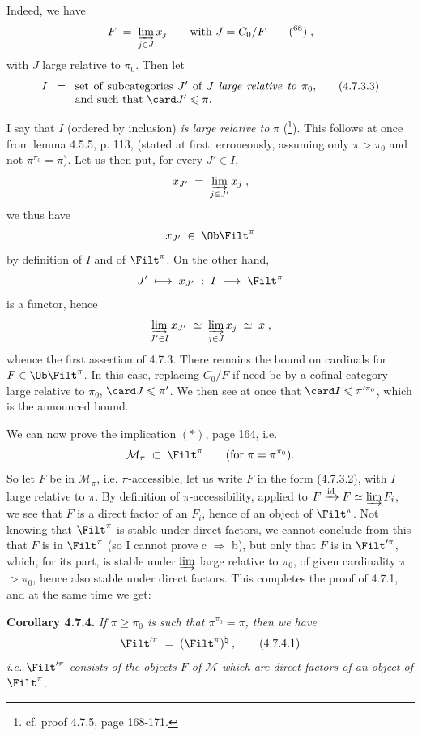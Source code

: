 Indeed, we have
\[
F \;=\; \varinjlim_{j \in J} x_j \qquad \text{with } J = C_0/F \qquad \text{(\footnotemark[68])}\;,
\]
with $J$ large relative to $\pi_0$. Then let
\[
I \;\;=\;\; \parbox[t]{0.62\textwidth}{set of subcategories $J'$ of $J$ \textit{large relative to} $\pi_0$, and such that $\card J' \leqslant \pi$.} \tag*{(4.7.3.3)}
\]


I say that $I$ (ordered by inclusion) \textit{is large relative to} $\pi$ (\footnote[69]{cf. proof 4.7.5, page 168-171.}). This follows at once from lemma 4.5.5, p. 113, (stated at first, erroneously, assuming only $\pi > \pi_0$ and not $\pi^{\pi_0} = \pi$). Let us then put, for every $J' \in I$,
\[
x_{J'} \;=\; \varinjlim_{j \in J'} x_j \;,
\]
we thus have
\[
x_{J'} \;\in\; \Ob \Filt^{\pi}
\]
by definition of $I$ and of $\Filt^{\pi}$. On the other hand,
\[
J' \;\longmapsto\; x_{J'} \;:\; I \;\longrightarrow\; \Filt^{\pi}
\]
is a functor, hence
\[
\varinjlim_{J' \in I} x_{J'} \;\simeq\; \varinjlim_{j \in J} x_j \;\simeq\; x \;, %
\]
whence the first assertion of 4.7.3. There remains the bound on cardinals for $F \in \Ob \Filt^{\pi}$. In this case, replacing $C_0/F$ if need be by a cofinal category large relative to $\pi_0$, $\card J \leqslant \pi'$. We then see at once that $\card I \leqslant \pi'^{\pi_0}$, which is the announced bound.

We can now prove the implication $(*)$, page 164, i.e.
\[
\mathcal{M}_{\pi} \;\subset\; \Filt^{\pi} \qquad (\text{for } \pi = \pi^{\pi_0}).
\]
So let $F$ be in $\mathcal{M}_{\pi}$, i.e. $\pi$-accessible, let us write $F$ in the form (4.7.3.2), with $I$ large relative to $\pi$. By definition of $\pi$-accessibility, applied to $F \xrightarrow{\mathrm{id}} F \simeq \varinjlim F_i$, we see that $F$ is a direct factor of an $F_i$, hence of an object of $\Filt^{\pi}$. Not knowing that $\Filt^{\pi}$ is stable under direct factors, we cannot conclude from this that $F$ is in $\Filt^{\pi}$ (so I cannot prove c $\Longrightarrow$ b), but only that $F$ is in $\Filt'^{\pi}$, which, for its part, is stable under $\varinjlim$ large relative to $\pi_0$, of given cardinality $\pi$ $> \pi_0$, hence also  stable under direct factors. This completes the proof of 4.7.1, and at the same time we get:

\textbf{Corollary 4.7.4.} \textit{If $\pi \geqslant \pi_0$ is such that $\pi^{\pi_0} = \pi$, then we have}
\[
\Filt'^{\pi} \;=\; (\Filt^{\pi})^{\natural} \;, \tag*{(4.7.4.1)}
\]
\textit{i.e.} $\Filt'^{\pi}$ \textit{consists of the objects $F$ of $\mathcal{M}$ which are direct factors of an object of} $\Filt^{\pi}$.

